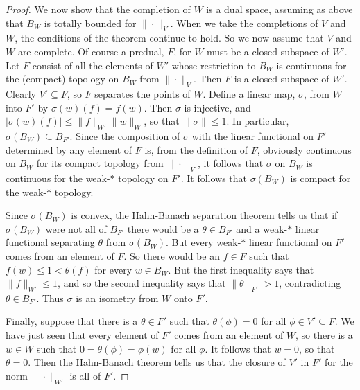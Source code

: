 \documentclass[10pt,a4paper]{amsart}
\newcommand{\s}{\sigma}
\begin{document}
\begin{proof}
We now show that the completion of $W$ is a dual space, assuming as above
that $B_W$ is totally bounded for $\|\cdot\|_V$. 
When we take the completions of $V$ and $W$, the conditions of the theorem
continue to hold. So we now assume that $V$ and $W$ are complete.
Of course a predual, $F$, for $W$ must
be a closed subspace of $W'$. Let $F$ consist of all the elements of $W'$
whose restriction to $B_W$ is continuous for the (compact) topology on $B_W$ 
from $\|\cdot\|_V$. Then $F$ is a closed subspace of $W'$.
Clearly $V' \subseteq F$, so $F$ separates the points of $W$. Define a linear
map, $\s$,  from $W$ into $F'$ by $\s(w)(f) = f(w)$. Then $\s$ is injective, and
$|\s(w)(f)| \leq \|f\|_{W'}\|w\|_W$, so that $\|\s\| \leq 1$. 
In particular, $\s(B_W) \subseteq B_{F'}$. Since the composition of $\s$
with the linear functional on $F'$ determined by any element of $F$ is, from the 
definition of $F$, obviously
 continuous on $B_W$ for its compact topology from $\|\cdot\|_V$, it follows that $\s$ 
 on $B_W$ is continuous
 for the weak-$*$ topology on $F'$. It follows that $\s(B_W)$ is compact for the
 weak-$*$ topology. 
 
 Since  $\s(B_W)$ is convex, the Hahn-Banach separation
 theorem tells us that
if $\s(B_W)$ were not all of $B_{F'}$ there would be a $\theta \in B_{F'}$ and
a weak-$*$ linear functional separating $\theta$ from $\s(B_W)$.  
But every weak-$*$ linear functional on $F'$ comes from an element of $F$.
So there would be an $f \in F$ such that $f(w) \leq 1 < \theta(f)$ for every
$w \in B_W$. But the first inequality says that $\|f\|_{W'} \leq 1$, and so
the second inequality says that $\|\theta\|_{F'} > 1$, contradicting
$\theta \in B_{F'}$. Thus $\s$ is an isometry from $W$ onto $F'$.

Finally, suppose that there is a $\theta \in F'$ such that 
$\theta(\phi) = 0$ for all $\phi \in V' \subseteq F$.
We have just seen that every element of $F'$ comes from an element of $W$,
so there is a $w \in W$ such that $0= \theta(\phi) =  \phi(w)$ for all $\phi$.
It follows that $w = 0$, so that $\theta = 0$. Then the Hahn-Banach theorem
tells us that the closure of $V'$ in $F'$ for the norm $\|\cdot\|_{W'}$ is all of $F'$.
\end{proof} 
\end{document}
